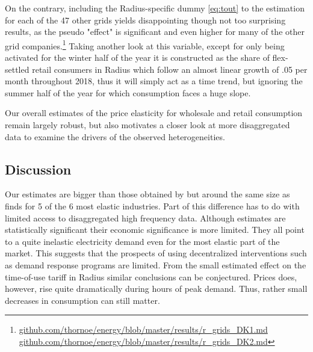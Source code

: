 \par
On the contrary, including the Radius-specific dummy \eqref{eq:tout} to the estimation for each of the 47 other grids yields disappointing though not too surprising results, as the pseudo "effect" is significant and even higher for many of the other grid companies.\footnote{\href{https://github.com/thornoe/energy/blob/master/results/r_grids_DK1.md}{github.com/thornoe/energy/blob/master/results/r\_grids\_DK1.md}\\\href{https://github.com/thornoe/energy/blob/master/results/r_grids_DK2.md}{github.com/thornoe/energy/blob/master/results/r\_grids\_DK2.md}} Taking another look at this variable, except for only being activated for the winter half of the year it is constructed as the share of flex-settled retail consumers in Radius which follow an almost linear growth of .05 per month throughout 2018, thus it will simply act as a time trend, but ignoring the summer half of the year for which consumption faces a huge slope.
\bigskip\par
Our overall estimates of the price elasticity for wholesale and retail consumption remain largely robust, but also motivates a closer look at more disaggregated data to examine the drivers of the observed heterogeneities.
\par

\begin{comment}
Takes from table 11:
* Effect mainly driven by DK1. DK2 smaller estimate and insignificant, but can be due to large standard errors smaller sample size of only 9 clusters
*Overall constant over time => cannot reject elasticities are the same.
Takes from table 12 - Estimation of largest grid companies separately:
*Cerius weird ass.
*differ a lot in magnitude
*Evonet has very high effect from no of meters
Takes from table 13:
* Changes over time elasticity. Highest in 2016, lowest in 2017. I don't know any explanations
\end{comment}



\subsection{Discussion}
\label{subsec:r_discussion}
Our estimates are bigger than those obtained by \citet{lijesen2007real} but around the same size as \citet{wolak2001impact} finds for 5 of the 6 most elastic industries. Part of this difference has to do with limited access to disaggregated high frequency data. Although estimates are statistically significant their economic significance is more limited. They all point to a quite inelastic electricity demand even for the most elastic part of the market. This suggests that the prospects of using decentralized interventions such as demand response programs are limited. From the small estimated effect on the time-of-use tariff in Radius similar conclusions can be conjectured. Prices does, however, rise quite dramatically during hours of peak demand. Thus, rather small decreases in consumption can still matter. %
\bigskip

